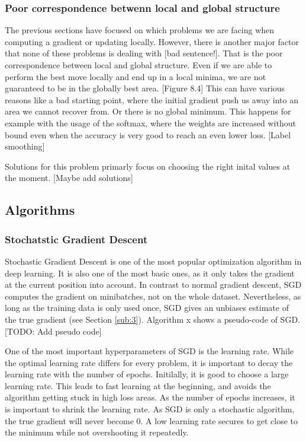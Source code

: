 \subsubsection{Poor correspondence betwenn local and global structure}\label{prob:5}
The previous sections have focused on which problems we are facing when
computing a gradient or updating locally. However, there is another major factor
that none of these problems is dealing with [bad sentence!]. That is the poor
correspondence between local and global structure. Even if we are able to
perform the best move locally and end up in a local minima, we are not
guaranteed to be in the globally best area. [Figure 8.4] This can have various
reasons like a bad starting point, where the initial gradient push us away into
an area we cannot recover from. Or there is no global minimum. This happens for
example with the usage of the softmax, where the weights are increased without
bound even when the accuracy is very good to reach an even lower loss. [Label
smoothing]

Solutions for this problem primarly focus on choosing the right inital values at
the moment. [Maybe add solutions]
\subsection{Algorithms}
\subsubsection{Stochatstic Gradient Descent}\label{SGD}
Stochastic Gradient Descent is one of the most popular optimization algorithm in
deep learning. It is also one of the most basic ones, as it only takes the
gradient at the current position into account. In contrast to normal gradient
descent, SGD computes the gradient on minibatches, not on the whole dataset.
Nevertheless, as long as the training data is only used once, SGD gives an
unbiases estimate of the true gradient (see Section \ref{sub:3}). Algorithm x
shows a pseudo-code of SGD.
[TODO: Add pseudo code]

One of the most important hyperparameters of SGD is the learning rate. While the
optimal learning rate differs for every problem, it is important to decay the
learning rate with the number of epochs. Initilally, it is good to choose a
large learning rate. This leads to fast learning at the beginning, and avoids
the algorithm getting stuck in high loss areas. As the number of epochs
increases, it is important to shrink the learning rate. As SGD is only a
stochastic algorithm, the true gradient will never become 0. A low learning rate
secures to get close to the minimum while not overshooting it repeatedly.

